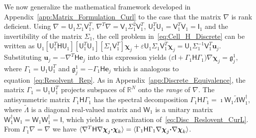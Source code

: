 \documentclass[english,12pt,jmp,graphicx]{revtex4-1}
\newcommand{\vecu}{\boldsymbol{u}}
\newcommand{\vecg}{\mathfrak{g}}
\newcommand{\vece}{\boldsymbol{e}}
\newcommand{\appref}[1]{Appendix~\ref{#1}}
\newcommand{\bcdot}{\mbox{\boldmath${\cdot}$}}
\newcommand{\vecchi}{\boldsymbol{\chi}}
\newcommand{\Hm}{\mathsf{H}}
\newcommand{\Um}{\mathsf{U}}
\newcommand{\Vm}{\mathsf{V}}
\newcommand{\Wm}{\mathsf{W}}
\newcommand{\Ib}{\mathsf{I}}
\begin{document}
We now generalize the mathematical framework developed in
\appref{app:Matrix_Formulation_Curl} to the case that the matrix $\nabla$ is rank
deficient. Using $\nabla=\Um_1\Sigma_1\Vm_1^T$,
$\nabla^T\nabla=\Vm_1\Sigma^2_1\Vm_1^T$, 
$\Um_1^T\Um_1=\Vm_1^T\Vm_1=\Ib_1$ 
and the invertibility of the matrix $\Sigma_1$, 
the cell problem in~\eqref{eq:Cell_H_Discrete} can be written as 
$\Um_1[\Um_1^T\Hm\Um_1][\Um_1^T\Um_1][\Sigma_1\Vm_1^T]\vecchi_j+\varepsilon\Um_1\Sigma_1\Vm_1^T\vecchi_j 
  =\Um_1\Sigma_1^{-1}\Vm_1^T\vecu_j.$
Substituting $\vecu_j=-\nabla^T\Hm\vece_j$
into this expression yields
$\big(\varepsilon\Ib+\Gamma_1\Hm\Gamma_1\big)\nabla\vecchi_j=\vecg^1_j$,
where $\Gamma_1=\Um_1\Um_1^T$ and $\vecg^1_j=-\Gamma_1\Hm\vece_j$
which is analogous to equation~\eqref{eq:Resolvent_Rep}. As in
\appref{app:Discrete_Equivalence}, the matrix $\Gamma_1=\Um_1\Um_1^T$
projects subspaces of $\mathbb{R}^N$ onto the \emph{range} of
$\nabla$.
The antisymmetric matrix $\Gamma_1\Hm\Gamma_1$ has the 
spectral decomposition
$\Gamma_1\Hm\Gamma_1=\imath\Wm_1\tilde{\Lambda}\Wm_1^\dagger$, where
$\tilde{\Lambda}$ is a diagonal real-valued matrix and $\Wm_1$ is a unitary
matrix $\Wm_1^\dagger\Wm_1=\Wm_1\Wm_1^\dagger=\Ib$, which yields a
generalization of~\eqref{eq:Disc_Reslovent_CurL}. 
From $\Gamma_1\nabla=\nabla$ we have
$\langle\nabla^T\Hm\nabla\vecchi_j\bcdot\vecchi_k\rangle=\langle\Gamma_1\Hm\Gamma_1\nabla\vecchi_j\bcdot\nabla\vecchi_k\rangle$. 
\end{document}
